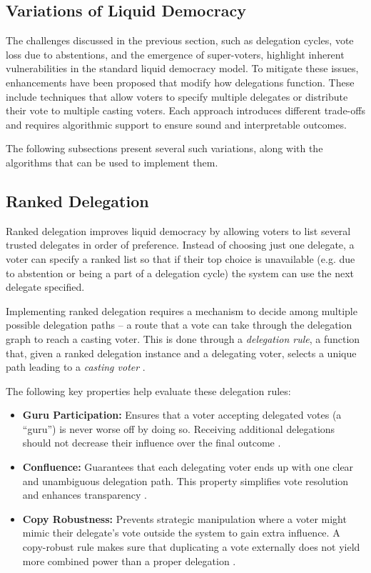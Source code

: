 \subsection{Variations of Liquid Democracy}
The challenges discussed in the previous section, such as delegation cycles, vote loss due to abstentions, and the emergence of super-voters, highlight inherent vulnerabilities in the standard liquid democracy model. To mitigate these issues, enhancements have been proposed that modify how delegations function. These include techniques that allow voters to specify multiple delegates or distribute their vote to multiple casting voters. Each approach introduces different trade-offs and requires algorithmic support to ensure sound and interpretable outcomes.

The following subsections present several such variations, along with the algorithms that can be used to implement them.
\subsection*{Ranked Delegation}
Ranked delegation improves liquid democracy by allowing voters to list several trusted delegates in order of preference. Instead of choosing just one delegate, a voter can specify a ranked list so that if their top choice is unavailable (e.g. due to abstention or being a part of a delegation cycle) the system can use the next delegate specified.

Implementing ranked delegation requires a mechanism to decide among multiple possible delegation paths -- a route that a vote can take through the delegation graph to reach a casting voter.
This is done through a \textit{delegation rule}, a function that, given a ranked delegation instance and a delegating voter, selects a unique path leading to a \textit{casting voter} \citep{brill_liquid_2022}.

The following key properties help evaluate these delegation rules:

\begin{itemize}
  \item \textbf{Guru Participation:} Ensures that a voter accepting delegated votes (a ``guru'') is never worse off by doing so. Receiving additional delegations should not decrease their influence over the final outcome \citep{kotsialou_riley_2020}. 
  \item \textbf{Confluence:} Guarantees that each delegating voter ends up with one clear and unambiguous delegation path. This property simplifies vote resolution and enhances transparency \citep{brill_liquid_2022}. 
  \item \textbf{Copy Robustness:} Prevents strategic manipulation where a voter might mimic their delegate's vote outside the system to gain extra influence. A copy-robust rule makes sure that duplicating a vote externally does not yield more combined power than a proper delegation \citep{brill_liquid_2022,behrens_2015}. 
\end{itemize}

